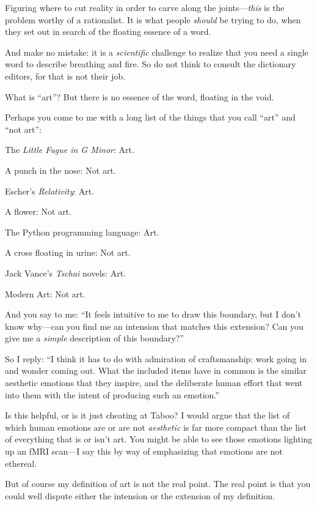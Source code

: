 {
 Figuring where to cut reality in order to carve along the
joints---\textit{this} is the problem worthy of a rationalist. It is
what people \textit{should} be trying to do, when they set out in
search of the floating essence of a word.}

{
 And make no mistake: it is a \textit{scientific} challenge to
realize that you need a single word to describe breathing and fire. So
do not think to consult the dictionary editors, for that is not their
job.}

{
 What is ``art''? But there is
no essence of the word, floating in the void.}

{
 Perhaps you come to me with a long list of the things that you
call ``art'' and
``not art'':}

{
 The \textit{Little Fugue in G Minor}: Art.}

{
 A punch in the nose: Not art.}

{
 Escher's \textit{Relativity}: Art.}

{
 A flower: Not art.}

{
 The Python programming language: Art.}

{
 A cross floating in urine: Not art.}

{
 Jack Vance's \textit{Tschai} novels: Art.}

{
 Modern Art: Not art.}

{
 And you say to me: ``It feels intuitive to me to
draw this boundary, but I don't know why---can you find
me an intension that matches this extension? Can you give me a
\textit{simple} description of this boundary?''}

{
 So I reply: ``I think it has to do with
admiration of craftsmanship: work going in and wonder coming out. What
the included items have in common is the similar aesthetic emotions
that they inspire, and the deliberate human effort that went into them
with the intent of producing such an emotion.''}

{
 Is this helpful, or is it just cheating at Taboo? I would argue
that the list of which human emotions are or are not \textit{aesthetic}
is far more compact than the list of everything that is or
isn't art. You might be able to see those emotions
lighting up an fMRI scan---I say this by way of emphasizing that
emotions are not ethereal.}

{
 But of course my definition of art is not the real point. The real
point is that you could well dispute either the intension or the
extension of my definition.}

